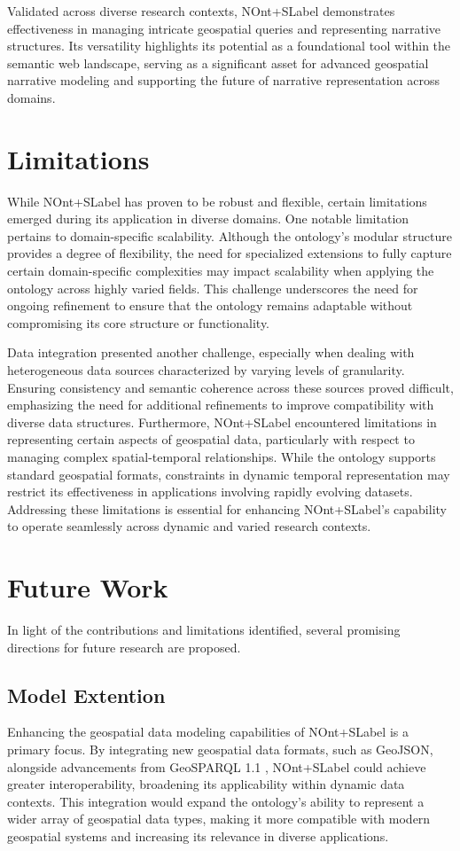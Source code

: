 Validated across diverse research contexts, \acrshort{NOnt+SLabel} demonstrates effectiveness in managing intricate geospatial queries and representing narrative structures. Its versatility highlights its potential as a foundational tool within the semantic web landscape, serving as a significant asset for advanced geospatial narrative modeling and supporting the future of narrative representation across domains.

\section{Limitations}

While \acrshort{NOnt+SLabel} has proven to be robust and flexible, certain limitations emerged during its application in diverse domains. One notable limitation pertains to domain-specific scalability. Although the ontology’s modular structure provides a degree of flexibility, the need for specialized extensions to fully capture certain domain-specific complexities may impact scalability when applying the ontology across highly varied fields. This challenge underscores the need for ongoing refinement to ensure that the ontology remains adaptable without compromising its core structure or functionality.

Data integration presented another challenge, especially when dealing with heterogeneous data sources characterized by varying levels of granularity. Ensuring consistency and semantic coherence across these sources proved difficult, emphasizing the need for additional refinements to improve compatibility with diverse data structures. Furthermore, \acrshort{NOnt+SLabel} encountered limitations in representing certain aspects of geospatial data, particularly with respect to managing complex spatial-temporal relationships. While the ontology supports standard geospatial formats, constraints in dynamic temporal representation may restrict its effectiveness in applications involving rapidly evolving datasets. Addressing these limitations is essential for enhancing \acrshort{NOnt+SLabel}’s capability to operate seamlessly across dynamic and varied research contexts.

\section{Future Work}
In light of the contributions and limitations identified, several promising directions for future research are proposed. 

\subsection{Model Extention}
Enhancing the geospatial data modeling capabilities of \acrshort{NOnt+SLabel} is a primary focus. By integrating new geospatial data formats, such as GeoJSON, alongside advancements from GeoSPARQL 1.1 \cite{carGeoSPARQL11Motivations2022}, \acrshort{NOnt+SLabel} could achieve greater interoperability, broadening its applicability within dynamic data contexts. This integration would expand the ontology’s ability to represent a wider array of geospatial data types, making it more compatible with modern geospatial systems and increasing its relevance in diverse applications.

